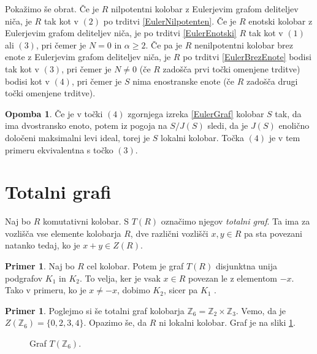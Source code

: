 \documentclass[a4paper, 12pt]{amsart}
\theoremstyle{definition} %
\newtheorem{primer}[definicija]{Primer}
\newtheorem{opomba}[definicija]{Opomba}
\theoremstyle{plain} %
\newcommand{\Z}{\mathbb Z}
\begin{document}
Pokažimo še obrat. 
Če je $R$ nilpotentni kolobar z Eulerjevim grafom deliteljev niča, je $R$ tak kot v $(2)$ po trditvi \ref{EulerNilpotenten}. Če je $R$ enotski kolobar z Eulerjevim grafom deliteljev niča, je po trditvi \ref{EulerEnotski} $R$ tak kot v $(1)$ ali $(3)$, pri čemer je $N=0$ in $\alpha \ge 2$. Če pa je $R$ nenilpotentni kolobar brez enote z Eulerjevim grafom deliteljev niča, je $R$ po trditvi \ref{EulerBrezEnote} bodisi tak kot v $(3)$, pri čemer je $N\neq 0$ (če $R$ zadošča prvi točki omenjene trditve) bodisi kot v $(4)$, pri čemer je $S$ nima enostranske enote (če $R$ zadošča drugi točki omenjene trditve). 

\endproof

\begin{opomba}
Če je v točki $(4)$ zgornjega izreka \ref{EulerGraf} kolobar $S$ tak, da ima dvostransko enoto, potem iz pogoja na $S/J(S)$ sledi, da je $J(S)$ enolično določeni maksimalni levi ideal, torej je $S$ lokalni kolobar. Točka $(4)$  je v tem primeru ekvivalentna s točko $(3)$.
\end{opomba}

\section{Totalni grafi}

Naj bo $R$ komutativni kolobar. S $T(R)$ označimo njegov \emph{totalni graf}. Ta ima za vozlišča vse elemente kolobarja $R$, dve različni vozlišči $x,y\in R$ pa sta povezani natanko tedaj, ko je $x+y\in Z(R)$.

\begin{primer}
Naj bo $R$ cel kolobar. Potem je graf $T(R)$ disjunktna unija podgrafov $K_1$ in $K_2$. To velja, ker je vsak $x\in R$ povezan le z elementom $-x$. Tako v primeru, ko je $x\neq -x$,  dobimo $K_2$, sicer pa $K_1$ . 
\end{primer}

\begin{primer}
Poglejmo si še totalni graf kolobarja $\Z_6 = \Z_2 \times \Z_3$. Vemo, da je $Z(\Z_6) = \{0,2,3,4\}$.  Opazimo še, da $R$ ni lokalni kolobar. Graf je na sliki \ref{T(Z2xZ3)}.
\end{primer}

\begin{figure}[h!]
\centering

\caption{Graf $T(\Z_6).$}
\label{T(Z2xZ3)}
\end{figure}
\end{document}
